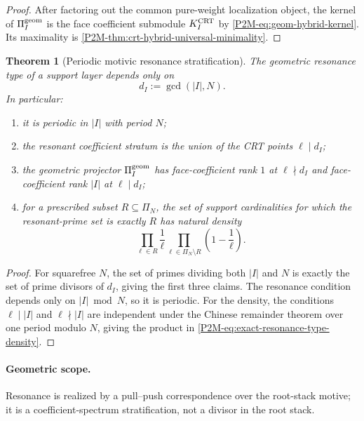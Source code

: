 \documentclass[11pt]{article}
\newtheorem{theorem}{Theorem}[section]
\theoremstyle{remark}
\begin{document}
\begin{proof}
After factoring out the common pure-weight localization object, the kernel of
\(\Pi_I^{\rm geom}\) is the face coefficient submodule
\(K_I^{\rm CRT}\) by \eqref{P2M-eq:geom-hybrid-kernel}.  Its maximality is
\cref{P2M-thm:crt-hybrid-universal-minimality}.
\end{proof}

\begin{theorem}[Periodic motivic resonance stratification]
\label{P2M-thm:periodic-motivic-resonance-stratification}
The geometric resonance type of a support layer depends only on
\begin{equation}
 \boxed{d_I:=\gcd(|I|,N).}
\end{equation}
In particular:
\begin{enumerate}[label=\textup{(\roman*)}]
\item it is periodic in \(|I|\) with period \(N\);
\item the resonant coefficient stratum is the union of the CRT points
      \(\ell\mid d_I\);
\item the geometric projector \(\Pi_I^{\rm geom}\) has face-coefficient
      rank \(1\) at \(\ell\nmid d_I\) and face-coefficient rank
      \(|I|\) at \(\ell\mid d_I\);
\item for a prescribed subset \(R\subseteq\Pi_N\), the set of support
      cardinalities for which the resonant-prime set is exactly \(R\) has
      natural density
\begin{equation}\label{P2M-eq:exact-resonance-type-density}
 \boxed{
 \prod_{\ell\in R}\frac1\ell
 \prod_{\ell\in\Pi_N\setminus R}
       \left(1-\frac1\ell\right).}
\end{equation}
\end{enumerate}
\end{theorem}

\begin{proof}
For squarefree \(N\), the set of primes dividing both \(|I|\) and \(N\) is
exactly the set of prime divisors of \(d_I\), giving the first three claims.
The resonance condition depends only on \(|I|\bmod N\), so it is periodic.
For the density, the conditions \(\ell\mid |I|\) and
\(\ell\nmid |I|\) are independent under the Chinese remainder theorem over
one period modulo \(N\), giving the product in
\eqref{P2M-eq:exact-resonance-type-density}.
\end{proof}

\paragraph{Geometric scope.}
Resonance is realized by a pull--push correspondence over the root-stack
motive; it is a coefficient-spectrum stratification, not a divisor in the
root stack.
\end{document}
